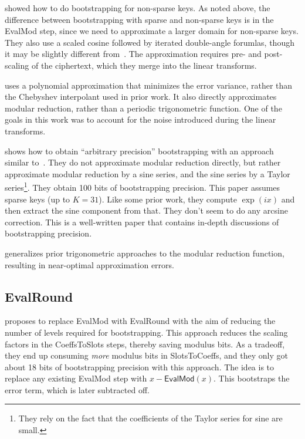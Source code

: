 \documentclass[../fheimpl.tex]{subfiles}
\begin{document}
    \cite{cryptoeprint:2020/1203} showed how to do bootstrapping for non-sparse keys. As noted above, the difference between bootstrapping with sparse and non-sparse keys is in the EvalMod step, since we need to approximate a larger domain for non-sparse keys. They also use a scaled cosine followed by iterated double-angle forumlas, though it may be slightly different from~\cite{cryptoeprint:2019/688}. The approximation requires pre- and post-scaling of the ciphertext, which they merge into the linear transforms.
    
    \cite{cryptoeprint:2020/1549} uses a polynomial approximation that minimizes the error variance, rather than the Chebyshev interpolant used in prior work. It also directly approximates modular reduction, rather than a periodic trigonometric function. One of the goals in this work was to account for the noise introduced during the linear transforms.
    
    \cite{cryptoeprint:2021/572} shows how to obtain ``arbitrary precision'' bootstrapping with an approach similar to~\cite{cryptoeprint:2018/153}. They do not approximate modular reduction directly, but rather approximate modular reduction by a sine series, and the sine series by a Taylor series\footnote{They rely on the fact that the coefficients of the Taylor series for sine are small.}. They obtain 100 bits of bootstrapping precision. This paper assumes sparse keys (up to $K=31$). Like some prior work, they compute $\exp(ix)$ and then extract the sine component from that. They don't seem to do any arcsine correction. This is a well-written paper that contains in-depth discussions of bootstrapping precision.

    \cite{cryptoeprint:2025/429} generalizes prior trigonometric approaches to the modular reduction function, resulting in near-optimal approximation errors. 
	
    \subsection{EvalRound}
    \cite{cryptoeprint:2022/1256} proposes to replace EvalMod with EvalRound with the aim of reducing the number of levels required for bootstrapping. This approach reduces the scaling factors in the CoeffsToSlots steps, thereby saving modulus bits. As a tradeoff, they end up consuming \emph{more} modulus bits in SlotsToCoeffs, and they only got about 18 bits of bootstrapping precision with this approach. The idea is to replace any existing EvalMod step with $x-\mathsf{EvalMod}(x)$. This bootstraps the error term, which is later subtracted off.
\end{document}
